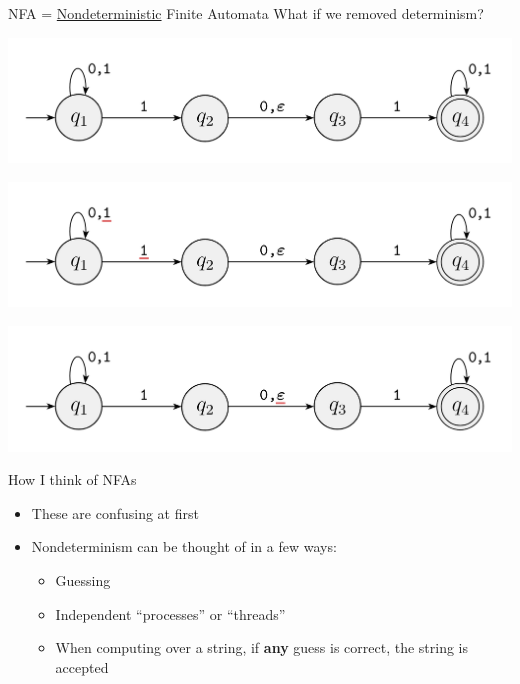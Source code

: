 \documentclass[aspectratio=169]{beamer}
\begin{document}
\begin{frame}{NFA = \underline{Nondeterministic} Finite Automata}
    What if we removed determinism? \pause
    \begin{center}
        \includegraphics[width=\textwidth]{N1.png}
    \end{center}
\end{frame}

\begin{frame}{}
    \begin{center}
        \includegraphics[width=\textwidth]{N1_multiple_1s.png}
    \end{center}
\end{frame}


\begin{frame}{}
    \begin{center}
        \includegraphics[width=\textwidth]{N1_epsilon.png}
    \end{center}
\end{frame}

\begin{frame}{How I think of NFAs}
    \begin{itemize}
        \item These are confusing at first
        \item Nondeterminism can be thought of in a few ways: \pause
        \begin{itemize}
            \item Guessing \pause
            \item Independent ``processes'' or ``threads'' \pause
            \item When computing over a string, if {\color{sigma@alertred}\textbf{any}} guess is correct, the string is accepted
        \end{itemize}
    \end{itemize}
\end{frame}
\end{document}
